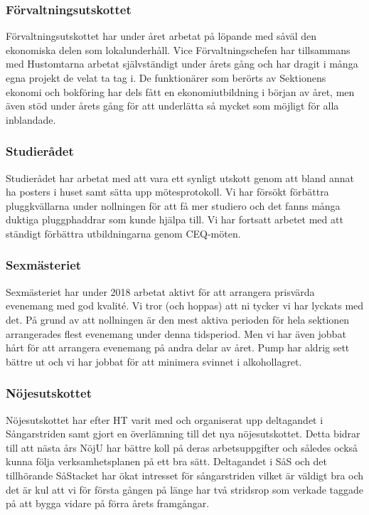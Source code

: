 \documentclass[../_main/handlingar.tex]{subfiles}
\begin{document}
\subsubsection*{Förvaltningsutskottet}

Förvaltningsutskottet har under året arbetat på löpande med såväl den ekonomiska delen
som lokalunderhåll. Vice Förvaltningschefen har tillsammans med Hustomtarna arbetat
självständigt under årets gång och har dragit i många egna projekt de velat ta tag i. De
funktionärer som berörts av Sektionens ekonomi och bokföring har dels fått en
ekonomiutbildning i början av året, men även stöd under årets gång för att underlätta så
mycket som möjligt för alla inblandade.

\subsubsection*{Studierådet}

Studierådet har arbetat med att vara ett synligt utskott genom att bland annat ha posters i huset samt sätta upp mötesprotokoll. Vi har försökt förbättra pluggkvällarna under nollningen för att få mer studiero och det fanns många duktiga pluggphaddrar som kunde hjälpa till. Vi har fortsatt arbetet med att ständigt förbättra utbildningarna genom CEQ-möten.


\subsubsection*{Sexmästeriet}

Sexmästeriet har under 2018 arbetat aktivt för att arrangera prisvärda evenemang med god
kvalité. Vi tror (och hoppas) att ni tycker vi har lyckats med det. På grund av att nollningen är
den mest aktiva perioden för hela sektionen arrangerades flest evenemang under denna
tidsperiod. Men vi har även jobbat hårt för att arrangera evenemang på andra delar av året.
Pump har aldrig sett bättre ut och vi har jobbat för att minimera svinnet i alkohollagret.

\subsubsection*{Nöjesutskottet}

Nöjesutskottet har efter HT varit med och organiserat upp deltagandet i Sångarstriden samt
gjort en överlämning till det nya nöjesutskottet. Detta bidrar till att nästa års NöjU har bättre
koll på deras arbetsuppgifter och således också kunna följa verksamhetsplanen på ett bra
sätt. Deltagandet i SåS och det tillhörande SåStacket har ökat intresset för sångarstriden
vilket är väldigt bra och det är kul att vi för första gången på länge har två stridsrop som
verkade taggade på att bygga vidare på förra årets framgångar.
\end{document}
